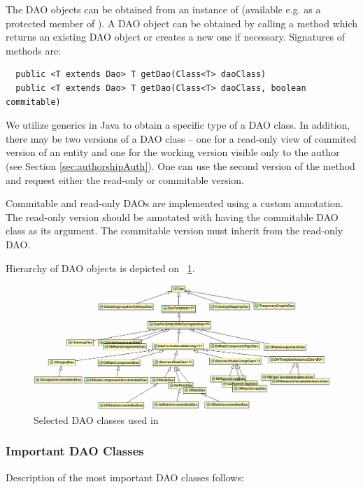 The DAO objects can be obtained from an instance of  (available e.g. as a protected member of ). A DAO object can be obtained by calling a  method which returns an existing DAO object or creates a new one if necessary. Signatures of  methods are:

\begin{verbatim}
  public <T extends Dao> T getDao(Class<T> daoClass)
  public <T extends Dao> T getDao(Class<T> daoClass, boolean commitable)
\end{verbatim}

We utilize generics in Java to obtain a specific type of a DAO class. In addition, there may be two versions of a DAO class -- one for a read-only view of commited version of an entity and one for the working version visible only to the author (see Section \ref{sec:authorshipAuth}). One can use the second version of the  method and request either the read-only or commitable version.

Commitable and read-only DAOs are implemented using a custom  annotation. The read-only version should be annotated with  having the commitable DAO class as its argument. The commitable version must inherit from the read-only DAO.

Hierarchy of DAO objects is depicted on \figurename~\ref{fig:feDAO}.

\begin{figure}[htb]
    \centering
    \includegraphics[width=1.05\textwidth]{images/dia-fe-dao.png}
    \caption{Selected DAO classes used in \FE}
	\label{fig:feDAO}
\end{figure}

\subsubsection{Important DAO Classes}
Description of the most important DAO classes follows:

